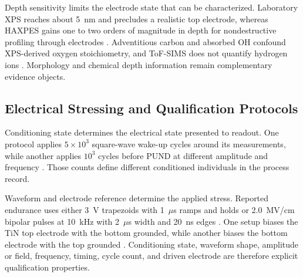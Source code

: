 \documentclass[11pt,a4paper]{report}
\begin{document}
Depth sensitivity limits the electrode state that can be characterized. Laboratory XPS reaches about 5~nm and precludes a realistic top electrode, whereas HAXPES gains one to two orders of magnitude in depth for nondestructive profiling through electrodes \cite{silva2023road}. Adventitious carbon and absorbed OH confound XPS-derived oxygen stoichiometry, and ToF-SIMS does not quantify hydrogen ions \cite{choi2025purge}. Morphology and chemical depth information remain complementary evidence objects.

\subsection{Electrical Stressing and Qualification Protocols}
\label{sec:ald-electrical-qualification-protocols}

Conditioning state determines the electrical state presented to readout. One protocol applies $5\times10^3$ square-wave wake-up cycles around its measurements, while another applies $10^3$ cycles before PUND at different amplitude and frequency \cite{choi2025purge,liu2025zrrich}. Those counts define different conditioned individuals in the process record.

Waveform and electrode reference determine the applied stress. Reported endurance uses either 3~V trapezoids with 1~$\mu$s ramps and holds or 2.0~MV/cm bipolar pulses at 10~kHz with 2~$\mu$s width and 20~ns edges \cite{choi2022chamber,choi2025purge}. One setup biases the TiN top electrode with the bottom grounded, while another biases the bottom electrode with the top grounded \cite{kim2020tin,liu2025zrrich}. Conditioning state, waveform shape, amplitude or field, frequency, timing, cycle count, and driven electrode are therefore explicit qualification properties.
\end{document}
